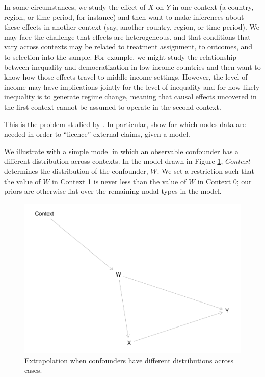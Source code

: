 \documentclass[
  12pt,
]{book}
\begin{document}
In some circumstances, we study the effect of \(X\) on \(Y\) in one context (a country, region, or time period, for instance) and then want to make inferences about these effects in another context (say, another country, region, or time period). We may face the challenge that effects are heterogeneous, and that conditions that vary across contexts may be related to treatment assignment, to outcomes, and to selection into the sample. For example, we might study the relationship between inequality and democratization in low-income countries and then want to know how those effects travel to middle-income settings. However, the level of income may have implications jointly for the level of inequality and for how likely inequality is to generate regime change, meaning that causal effects uncovered in the first context cannot be assumed to operate in the second context.

This is the problem studied by \citet{pearl2014external}. In particular, \citet{pearl2014external} show for which nodes data are needed in order to ``licence'' external claims, given a model.

We illustrate with a simple model in which an observable confounder has a different distribution across contexts. In the model drawn in Figure \ref{fig:extval}, \(Context\) determines the distribution of the confounder, \(W\). We set a restriction such that the value of \(W\) in Context 1 is never less than the value of \(W\) in Context 0; our priors are otherwise flat over the remaining nodal types in the model.

\begin{figure}
\centering
\includegraphics{ii_files/figure-latex/extval-1.pdf}
\caption{\label{fig:extval}Extrapolation when confounders have different distributions across cases.}
\end{figure}
\end{document}
